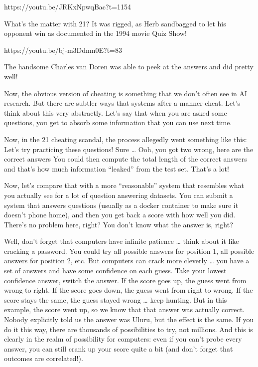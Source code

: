https://youtu.be/JRKxNpwqBac?t=1154

What’s the matter with 21?  It was rigged, as Herb sandbagged to let his opponent win as documented in the 1994 movie Quiz Show!  

https://youtu.be/bj-m3Ddmn0E?t=83

The handsome Charles van Doren was able to peek at the answers and did pretty well!

Now, the obvious version of cheating is something that we don’t often see in AI research.  But there are subtler ways that systems after a manner cheat.  Let’s think about this very abstractly.  Let’s say that when you are asked some questions, you get to absorb some information that you can use next time.

Now, in the 21 cheating scandal, the process allegedly went something like this: 
Let’s try practicing these questions!
Sure …
Ooh, you got two wrong, here are the correct answers
You could then compute the total length of the correct answers and that’s how much information “leaked” from the test set.  That’s a lot!  

Now, let’s compare that with a more “reasonable” system that resembles what you actually see for a lot of question answering datasets.  You can submit a system that answers questions (usually as a docker container to make sure it doesn’t phone home), and then you get back a score with how well you did.  There’s no problem here, right?  You don’t know what the answer is, right?

Well, don’t forget that computers have infinite patience … think about it like cracking a password.  You could try all possible answers for position 1, all possible answers for position 2, etc.  But computers can crack more cleverly … you have a set of answers and have some confidence on each guess.  Take your lowest confidence answer, switch the answer.  
If the score goes up, the guess went from wrong to right.  
If the score goes down, the guess went from right to wrong.
If the score stays the same, the guess stayed wrong … keep hunting.
But in this example, the score went up, so we know that that answer was actually correct.  Nobody explicitly told us the answer was Uluru, but the effect is the same.  If you do it this way, there are thousands of possibilities to try, not millions.  And this is clearly in the realm of possibility for computers: even if you can’t probe every answer, you can still crank up your score quite a bit (and don’t forget that outcomes are correlated!).

